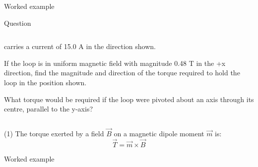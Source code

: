 {\begin{frame}{Worked example}
\begin{blockexmplque}{Question}
\begin{columns}
\begin{column}{0.70\textwidth}
{       carries a current of 15.0 A in the direction shown.
       \begin{enumerate}
       {\small
          \item
             If the loop is in uniform magnetic field with magnitude 0.48 T in the +x direction,
             find the magnitude and direction of the torque required to hold the loop
             in the position shown.
         \item
             What torque would be required if the loop were pivoted about an axis
            through its centre, parallel to the y-axis?
       }
       \end{enumerate}
   }
  \end{column}
\end{columns}
\end{blockexmplque}

\vspace{0.3cm}

{\small
        (1) The torque exerted by a field $\vec{B}$ on a magnetic dipole moment $\vec{m}$ is:
         \begin{equation*}
            \vec{T} = \vec{m} \times \vec{B}
         \end{equation*}
}

\end{frame}


%
%
%

\begin{frame}{Worked example}


\end{frame}}
